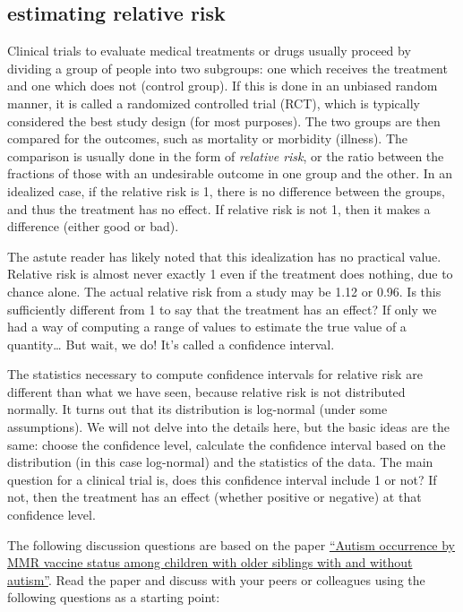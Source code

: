 \documentclass[
]{book}
\theoremstyle{definition}
\theoremstyle{definition}
\theoremstyle{definition}
\theoremstyle{remark}
\begin{document}
\hypertarget{estimating-relative-risk}{%
\subsection{estimating relative risk}\label{estimating-relative-risk}}

Clinical trials to evaluate medical treatments or drugs usually proceed by dividing a group of people into two subgroups: one which receives the treatment and one which does not (control group). If this is done in an unbiased random manner, it is called a randomized controlled trial (RCT), which is typically considered the best study design (for most purposes). The two groups are then compared for the outcomes, such as mortality or morbidity (illness). The comparison is usually done in the form of \emph{relative risk}, or the ratio between the fractions of those with an undesirable outcome in one group and the other. In an idealized case, if the relative risk is 1, there is no difference between the groups, and thus the treatment has no effect. If relative risk is not 1, then it makes a difference (either good or bad).

The astute reader has likely noted that this idealization has no practical value. Relative risk is almost never exactly 1 even if the treatment does nothing, due to chance alone. The actual relative risk from a study may be 1.12 or 0.96. Is this sufficiently different from 1 to say that the treatment has an effect? If only we had a way of computing a range of values to estimate the true value of a quantity\ldots{} But wait, we do! It's called a confidence interval.

The statistics necessary to compute confidence intervals for relative risk are different than what we have seen, because relative risk is not distributed normally. It turns out that its distribution is log-normal (under some assumptions). We will not delve into the details here, but the basic ideas are the same: choose the confidence level, calculate the confidence interval based on the distribution (in this case log-normal) and the statistics of the data. The main question for a clinical trial is, does this confidence interval include 1 or not? If not, then the treatment has an effect (whether positive or negative) at that confidence level.

The following discussion questions are based on the paper \href{https://jamanetwork.com/journals/jama/fullarticle/2275444}{``Autism occurrence by MMR vaccine status among children with older siblings with and without autism''}. Read the paper and discuss with your peers or colleagues using the following questions as a starting point:
\end{document}
